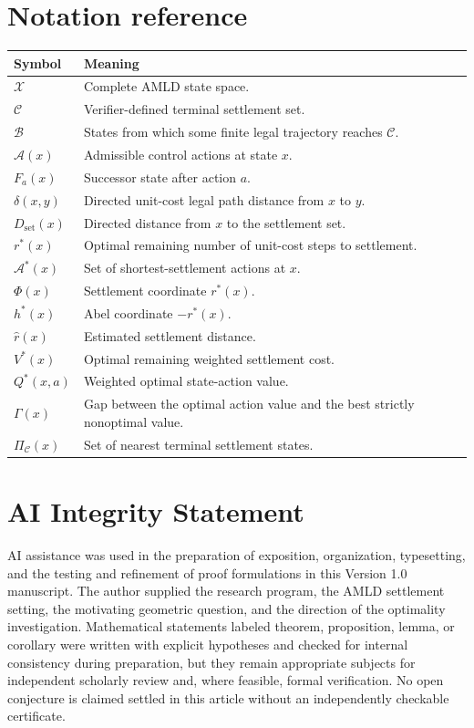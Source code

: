 \documentclass[11pt,letterpaper]{article}
\theoremstyle{remark}
\newcommand{\X}{\mathcal X}
\newcommand{\Cset}{\mathcal C}
\newcommand{\Basin}{\mathcal B}
\newcommand{\A}{\mathcal A}
\newcommand{\rstar}{r^{\!*}}
\newcommand{\dset}{D_{\mathrm{set}}}
\newcommand{\rhat}{\widehat r}
\newcommand{\Qstar}{Q^{\!*}}
\begin{document}
\section{Notation reference}\label{app:notation}

\begin{longtable}{p{}p{}}
\toprule
\textbf{Symbol} & \textbf{Meaning}\\
\midrule
\endhead
$\X$ & Complete AMLD state space.\\
$\Cset$ & Verifier-defined terminal settlement set.\\
$\Basin$ & States from which some finite legal trajectory reaches $\Cset$.\\
$\A(x)$ & Admissible control actions at state $x$.\\
$F_a(x)$ & Successor state after action $a$.\\
$\delta(x,y)$ & Directed unit-cost legal path distance from $x$ to $y$.\\
$\dset(x)$ & Directed distance from $x$ to the settlement set.\\
$\rstar(x)$ & Optimal remaining number of unit-cost steps to settlement.\\
$\A^*(x)$ & Set of shortest-settlement actions at $x$.\\
$\Phi(x)$ & Settlement coordinate $\rstar(x)$.\\
$h^*(x)$ & Abel coordinate $-\rstar(x)$.\\
$\rhat(x)$ & Estimated settlement distance.\\
$V^*(x)$ & Optimal remaining weighted settlement cost.\\
$\Qstar(x,a)$ & Weighted optimal state-action value.\\
$\Gamma(x)$ & Gap between the optimal action value and the best strictly nonoptimal value.\\
$\Pi_{\Cset}(x)$ & Set of nearest terminal settlement states.\\
\bottomrule
\end{longtable}

\section*{AI Integrity Statement}
AI assistance was used in the preparation of exposition, organization, typesetting, and the testing and refinement of proof formulations in this Version 1.0 manuscript. The author supplied the research program, the AMLD settlement setting, the motivating geometric question, and the direction of the optimality investigation. Mathematical statements labeled theorem, proposition, lemma, or corollary were written with explicit hypotheses and checked for internal consistency during preparation, but they remain appropriate subjects for independent scholarly review and, where feasible, formal verification. No open conjecture is claimed settled in this article without an independently checkable certificate.
\end{document}

